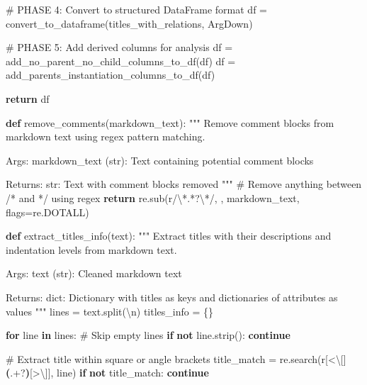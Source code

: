 \documentclass[
  11pt,
  letterpaper,
]{book}
\newenvironment{Shaded}{\begin{snugshade}}{\end{snugshade}}
\newcommand{\CharTok}[1]{\textcolor[rgb]{0.13,0.47,0.30}{#1}}
\newcommand{\CommentTok}[1]{\textcolor[rgb]{0.37,0.37,0.37}{#1}}
\newcommand{\ControlFlowTok}[1]{\textcolor[rgb]{0.00,0.23,0.31}{\textbf{#1}}}
\newcommand{\DecValTok}[1]{\textcolor[rgb]{0.68,0.00,0.00}{#1}}
\newcommand{\KeywordTok}[1]{\textcolor[rgb]{0.00,0.23,0.31}{\textbf{#1}}}
\newcommand{\NormalTok}[1]{\textcolor[rgb]{0.00,0.23,0.31}{#1}}
\newcommand{\OperatorTok}[1]{\textcolor[rgb]{0.37,0.37,0.37}{#1}}
\newcommand{\PreprocessorTok}[1]{\textcolor[rgb]{0.68,0.00,0.00}{#1}}
\newcommand{\StringTok}[1]{\textcolor[rgb]{0.13,0.47,0.30}{#1}}
\newcommand{\VerbatimStringTok}[1]{\textcolor[rgb]{0.13,0.47,0.30}{#1}}
\begin{document}
\begin{landscape}
\begin{Shaded}
\begin{Highlighting}[]
    \CommentTok{\# PHASE 4: Convert to structured DataFrame format}
\NormalTok{    df }\OperatorTok{=}\NormalTok{ convert\_to\_dataframe(titles\_with\_relations, ArgDown)}

    \CommentTok{\# PHASE 5: Add derived columns for analysis}
\NormalTok{    df }\OperatorTok{=}\NormalTok{ add\_no\_parent\_no\_child\_columns\_to\_df(df)}
\NormalTok{    df }\OperatorTok{=}\NormalTok{ add\_parents\_instantiation\_columns\_to\_df(df)}

    \ControlFlowTok{return}\NormalTok{ df}

\KeywordTok{def}\NormalTok{ remove\_comments(markdown\_text):}
    \CommentTok{"""}
\CommentTok{    Remove comment blocks from markdown text using regex pattern matching.}

\CommentTok{    Args:}
\CommentTok{        markdown\_text (str): Text containing potential comment blocks}

\CommentTok{    Returns:}
\CommentTok{        str: Text with comment blocks removed}
\CommentTok{    """}
    \CommentTok{\# Remove anything between /* and */ using regex}
    \ControlFlowTok{return}\NormalTok{ re.sub(}\VerbatimStringTok{r\textquotesingle{}/}\CharTok{\textbackslash{}*}\DecValTok{.}\OperatorTok{*?}\CharTok{\textbackslash{}*}\VerbatimStringTok{/\textquotesingle{}}\NormalTok{, }\StringTok{\textquotesingle{}\textquotesingle{}}\NormalTok{, markdown\_text, flags}\OperatorTok{=}\NormalTok{re.DOTALL)}

\KeywordTok{def}\NormalTok{ extract\_titles\_info(text):}
    \CommentTok{"""}
\CommentTok{    Extract titles with their descriptions and indentation levels from markdown text.}

\CommentTok{    Args:}
\CommentTok{        text (str): Cleaned markdown text}

\CommentTok{    Returns:}
\CommentTok{        dict: Dictionary with titles as keys and dictionaries of attributes as values}
\CommentTok{    """}
\NormalTok{    lines }\OperatorTok{=}\NormalTok{ text.split(}\StringTok{\textquotesingle{}}\CharTok{\textbackslash{}n}\StringTok{\textquotesingle{}}\NormalTok{)}
\NormalTok{    titles\_info }\OperatorTok{=}\NormalTok{ \{\}}

    \ControlFlowTok{for}\NormalTok{ line }\KeywordTok{in}\NormalTok{ lines:}
        \CommentTok{\# Skip empty lines}
        \ControlFlowTok{if} \KeywordTok{not}\NormalTok{ line.strip():}
            \ControlFlowTok{continue}

        \CommentTok{\# Extract title within square or angle brackets}
\NormalTok{        title\_match }\OperatorTok{=}\NormalTok{ re.search(}\VerbatimStringTok{r\textquotesingle{}}\PreprocessorTok{[\textless{}}\CharTok{\textbackslash{}[}\PreprocessorTok{]}\KeywordTok{(}\DecValTok{.}\OperatorTok{+?}\KeywordTok{)}\PreprocessorTok{[\textgreater{}}\CharTok{\textbackslash{}]}\PreprocessorTok{]}\VerbatimStringTok{\textquotesingle{}}\NormalTok{, line)}
        \ControlFlowTok{if} \KeywordTok{not}\NormalTok{ title\_match:}
            \ControlFlowTok{continue}


\end{Highlighting}
\end{Shaded}
\end{landscape}
\end{document}
